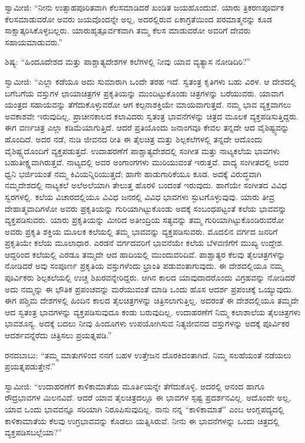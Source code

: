  ಸ್ವಾಮೀಜಿ: “ನೀನು ಉತ್ಸಾಹಪೂರಿತವಾಗಿ ಕೆಲಸಮಾಡಿದರೆ ಖಂಡಿತ ಜಯಹೊಂದುವೆ. ಯಾರು ತ್ರಿಕರಣಪೂರ್ವಕ ಕೆಲಸಮಾಡುವರೋ ಅವರು ಜಯವೊಂದನ್ನೇ ಅಲ್ಲ, ಅದರಲ್ಲಿರುವ ಏಕಾಗ್ರತೆಯಿಂದ ಪರಮಾತ್ಮನನ್ನು ಕೂಡ ಸಾಕ್ಷಾತ್ಕರಿಸಿಕೊಳ್ಳಬಲ್ಲರು. ಯಾರು\break ಹೃತ್ಪೂರ್ವಕವಾಗಿ ತಮ್ಮ ಕೆಲಸ ಮಾಡುವರೋ ಅವರಿಗೆ ದೇವರು ಸಹಾಯಮಾಡುವರು.” 

 ಶಿಷ್ಯ: “ಹಿಂದೂದೇಶದ ಮತ್ತು ಪಾಶ್ಚಾತ್ಯದೇಶಗಳ ಕಲೆಗಳಲ್ಲಿ ನೀವು ಯಾವ ವ್ಯತ್ಯಾಸ ನೋಡಿದಿರಿ?” 

 ಸ್ವಾಮೀಜಿ: “ಎಲ್ಲಾ ಕಡೆಯೂ ಅದು ಸುಮಾರಾಗಿ ಒಂದೇ ತರಹ ಇದೆ. ಸ್ವತಂತ್ರ ಕೃತಿಗಳು ಬಹು ವಿರಳ. ಆ ದೇಶದಲ್ಲಿ ಬಗೆಬಗೆಯ ವಸ್ತುಗಳ ಛಾಯಾಚಿತ್ರಗಳ ಪ್ರಕೃತಿಯನ್ನು ಮುಂದಿಟ್ಟುಕೊಂಡು ಚಿತ್ರಗಳನ್ನು ಬರೆಯುವರು. ಯಾವಾಗ ಯಂತ್ರದ ಸಹಾಯವನ್ನು ತೆಗೆದುಕೊಳ್ಳುವರೋ ಆಗ ಕಲ್ಪನಾಶಕ್ತಿಯೇ ಮಾಯವಾಗುತ್ತದೆ. ನಮ್ಮ ಭಾವ ವ್ಯಕ್ತವಾಗಲು ಅವಕಾಶವೇ ಇರುವುದಿಲ್ಲ. ಪ್ರಾಚೀನಕಾಲದ ಕಲಾವಿದರು ಸ್ವತಂತ್ರ ಭಾವನೆಗಳನ್ನು ಚಿತ್ರದ ಮೂಲಕ ವ್ಯಕ್ತಪಡಿಸುತ್ತಿದ್ದರು. ಈಗ ವರ್ಣಚಿತ್ರ ಎಲ್ಲಾ ಕಡಿಮೆಯಾಗುತ್ತಿದೆ. ಆದರೆ ಪ್ರತಿಯೊಂದು ಜನಾಂಗವೂ ಕೇವಲ ತನ್ನದೇ ಆದ ವೈಶಿಷ್ಟ್ಯವನ್ನು ಹೊಂದಿದೆ. ಅದರ ನಡೆ, ನುಡಿ ಜೀವನದ ರೀತಿ ಈ ತೈಲಚಿತ್ರ ಮತ್ತು ಶಿಲ್ಪಕಲೆಗಳಲ್ಲಿ ತನ್ನದೇ ಆದೊಂದು ವೈಶಿಷ್ಟ್ಯದೊಂದಿಗೆ ವ್ಯಕ್ತಪಡುತ್ತದೆ. ಉದಾಹರಣೆಗೆ ಪಾಶ್ಚಾತ್ಯದೇಶದಲ್ಲಿ ಸಂಗೀತ ಮತ್ತು ನಾಟ್ಯಕಲೆಯ ಭಾವಗಳು ಬಹುತೀಕ್ಷ್ಣವಾಗಿರುತ್ತವೆ. ನಾಟ್ಯದಲ್ಲಿ ಅವರ ಅಂಗಾಂಗಗಳು ಮುರಿಯುವಂತೆ ಇರುತ್ತವೆ. ವಾದ್ಯ ಸಂಗೀತದಲ್ಲಿ ಅವರ ಧ್ವನಿ ಭರ್ಜಿಯಂತೆ ನಮ್ಮ ಕಿವಿಯನ್ನಿರಿಯುತ್ತದೆ; ಹಾಗೇ ಹಾಡುಗಾರಿಕೆಯೂ ಕೂಡ. ಅದಕ್ಕೆ ವಿರುದ್ಧವಾಗಿ ನಮ್ಮ\break ದೇಶದಲ್ಲಿ ನಾಟ್ಯಕಲೆ ಅಲೆಅಲೆಯಾಗಿ ತೇಲುತ್ತ ಹೊರಳಿ ಬಂದಂತೆ ಇರುವುದು. ಹಾಗೆಯೇ ಸಂಗೀತದ ವಿವಿಧ ಸ್ವರಗಳಲ್ಲಿ. ಕಲೆಯ ವಿಚಾರದಲ್ಲಿಯೂ ವಿವಿಧ ಜನರಲ್ಲಿ ವಿವಿಧ ಭಾವಗಳು ಸ್ಫುಟಗೊಳ್ಳುವುವು. ಯಾರು ತೀವ್ರ ದೇಹಾತ್ಮವಾದಿಗಳೋ ಅವರು ಪ್ರಕೃತಿಯನ್ನು ಗುರಿಯಾಗಿಟ್ಟುಕೊಂಡು ಅದಕ್ಕೆ ಸಂಬಂಧಪಟ್ಟಂತೆ ಕಲೆಯ ಭಾವವನ್ನು ವ್ಯಕ್ತಪಡಿಸುವರು. ಯಾರು ಪ್ರಕೃತಿಯನ್ನು ಮೀರಿದ ಅತೀಂದ್ರಿಯ ಸತ್ಯವನ್ನು ತಮ್ಮ ಗುರಿಯಾಗಿಟ್ಟುಕೊಂಡಿರುವರೋ ಅವರು ಪ್ರಕೃತಿ ಶಕ್ತಿಯ ಮೂಲಕ ಕಲೆಯಲ್ಲಿ ತಮ್ಮ ಭಾವವನ್ನು ವ್ಯಕ್ತಪಡಿಸುವರು. ಮೊದಲಿನ ವರ್ಗದ ಜನರಿಗೆ ಪ್ರಕೃತಿಯೇ ಕಲೆಯ ಮೂಲಾಧಾರ. ಎರಡನೆ ವರ್ಗದವರಿಗೆ ಭಾವನೆಯೇ ಕಲೆಯ ಬೆಳವಣಿಗೆಗೆ ಮುಖ್ಯ ಉದ್ದೇಶ. ಆದ್ದರಿಂದ ಕಲೆಯಲ್ಲಿ ಎರಡೂ ತಮ್ಮದೇ ಆದ ಹಾದಿಯಲ್ಲಿ ಮುಂದುವರಿದಿವೆ. ಪಾಶ್ಚಾತ್ಯರ ಕೆಲವು ತೈಲಚಿತ್ರಗಳನ್ನು ನೋಡಿದರೆ ಅವು ಸಂಪೂರ್ಣ ಪ್ರಕೃತಿಯ ವಸ್ತುಗಳೆಂದು ಭ್ರಾಂತಿ ಪಡುವಂತಾಗುವುದು. ಈ ದೇಶದಲ್ಲಿಯೂ ನಮ್ಮ ಪೂರ್ವಿಕರು ಶಿಲ್ಪಕಲೆಯಲ್ಲಿ ಉಚ್ಚ ಶಿಖರವನ್ನೇರಿದ್ದರು. ಆಗಿನ ಕಾಲದ ಯಾವುದಾದರೊಂದು ವಿಗ್ರಹವನ್ನು ನೋಡಿದರೆ ಅದು ನಮ್ಮನ್ನು ಈ ಭೌತಿಕ ಪ್ರಪಂಚವನ್ನು ಮರೆಯುವಂತೆ ಮಾಡಿ ಒಂದು ಹೊಸ ಆದರ್ಶ ಪ್ರಪಂಚಕ್ಕೆ ಒಯ್ಯುವುದು. ಈಗ ಪಶ್ಚಿಮ ದೇಶಗಳಲ್ಲಿ ಹಿಂದಿನ ಕಾಲದ ತೈಲಚಿತ್ರಗಳನ್ನು ಚಿತ್ರಿಸಲಾಗುತ್ತಿಲ್ಲ. ಅದರಂತೆ ಈ ದೇಶದಲ್ಲಿಯೂ ತಮ್ಮದೇ ಆದ ಸ್ವತಂತ್ರ ಭಾವಗಳನ್ನು ವ್ಯಕ್ತಪಡಿಸುವುದೂ ಕಂಡು ಬರುವುದಿಲ್ಲ. ಉದಾಹರಣೆಗೆ ನಿಮ್ಮ ಕಲಾಶಾಲೆಯ ತೈಲಚಿತ್ರಗಳು ಭಾವಶೂನ್ಯ. ಅದಕ್ಕೆ ಬದಲು ನೀವು ಹಿಂದೂಗಳು ಉಪಯೋಗಿಸುವ ನಿತ್ಯಜೀವನದ ವಸ್ತುಗಳನ್ನು ಅದಕ್ಕೆ ಪೂರ್ವಿಕರ ಆದರ್ಶವನ್ನೆರೆದು ಚಿತ್ರಿಸಲು ಪ್ರಯತ್ನಪಡಿ.” 

 ರನದಬಾಬು: “ತಮ್ಮ ಮಾತುಗಳಿಂದ ನನಗೆ ಬಹಳ ಉತ್ತೇಜನ ದೊರಕಿದಂತಾಗಿದೆ. ನಿಮ್ಮ ಸಲಹೆಯಂತೆ ನಡೆಯಲು ಪ್ರಯತ್ನಪಡುತ್ತೇನೆ.” 

 ಸ್ವಾಮೀಜಿ: “ಉದಾಹರಣೆಗೆ ಕಾಳಿಕಾಮಾತೆಯ ಮೂರ್ತಿಯನ್ನೇ ತೆಗೆದುಕೊಳ್ಳಿ. ಅದರಲ್ಲಿ ಆನಂದ ಹಾಗೂ ರೌದ್ರಭಾವಗಳ ಮಿಲನವಿದೆ. ಆದರೆ ಯಾವ ತೈಲಚಿತ್ರದಲ್ಲೂ ಈ ಭಾವಗಳ ಸ್ಪಷ್ಟ ಪ್ರದರ್ಶನವಿಲ್ಲ. ಅದೊಂದೇ ಅಲ್ಲ, ಯಾವ ಒಂದು ಭಾವವನ್ನೂ ಸರಿಯಾಗಿ ನಿರೂಪಿಸುವುದಿಲ್ಲ. ನಾನು ನನ್ನ “ಕಾಳಿಕಾಮಾತೆ” ಎಂಬ ಆಂಗ್ಲಪದ್ಯದಲ್ಲಿ ಕಾಳಿಕಾಮಾತೆಯ ಕೆಲವು ಉಗ್ರಭಾವವನ್ನು ಕೊಡಲು ಯತ್ನಿಸಿರುವೆ. ನೀನು ಈ ಭಾವನೆಗಳನ್ನು ಒಂದು ಚಿತ್ರದಲ್ಲಿ ವ್ಯಕ್ತಪಡಿಸಬಲ್ಲೆಯಾ?” 

